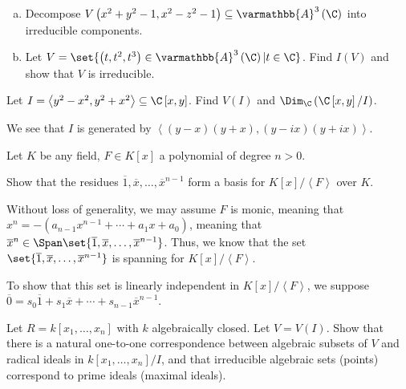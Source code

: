 \documentclass[10pt]{mypackage}
\renewcommand*{\mathbb}[1]{\varmathbb{#1}}
\newcommand{\A}{\mathbb{A}}
\begin{document}
\begin{exercise}[Exercise 1.33]\hfill
  \begin{enumerate}[(a)]
    \item Decompose $V\left( x^2 + y^2 - 1,x^2 - z^2 - 1 \right)\subseteq \A^3\left( \C \right)$ into irreducible components.
    \item Let $V = \set{\left( t,t^2,t^3 \right)\in \A^3\left( \C \right) | t\in \C}$. Find $I(V)$ and show that $V$ is irreducible.
  \end{enumerate}
\end{exercise}
\begin{exercise}[Exercise 1.36]
  Let $I = \left\langle y^2-x^2,y^2 + x^2 \right\rangle\subseteq \C\left[ x,y \right]$. Find $V(I)$ and $\Dim_{\C}\left( \C\left[ x,y \right]/I \right)$.
\end{exercise}
\begin{solution}
  We see that $I$ is generated by $\left\langle \left( y-x \right)\left( y+x \right),\left( y-ix \right)\left( y+ix \right) \right\rangle$. 
\end{solution}
\begin{exercise}[Exercise 1.37]
  Let $K$ be any field, $F\in K\left[ x \right]$ a polynomial of degree $n > 0$.\newline

  Show that the residues $\overline{1},\overline{x},\dots,\overline{x}^{n-1}$ form a basis for $K\left[ x \right]/\left\langle F \right\rangle$ over $K$.
\end{exercise}
\begin{solution}
  Without loss of generality, we may assume $F$ is monic, meaning that $x^{n} = -\left( a_{n-1}x^{n-1} + \cdots + a_1x + a_0 \right)$, meaning that $\overline{x}^n \in \Span\set{\overline{1},\overline{x},\dots,\overline{x}^{n-1}}$. Thus, we know that the set $\set{\overline{1},\overline{x},\dots,\overline{x}^{n-1}}$ is spanning for $K\left[ x \right]/\left\langle F \right\rangle$.\newline

  To show that this set is linearly independent in $K\left[ x \right]/\left\langle F \right\rangle$, we suppose $\overline{0} = s_0\overline{1} + s_1\overline{x} + \cdots + s_{n-1}\overline{x}^{n-1}$.
\end{solution}
\begin{exercise}[Exercise 1.38]
  Let $R = k\left[ x_1,\dots,x_n \right]$ with $k$ algebraically closed. Let $V = V(I)$. Show that there is a natural one-to-one correspondence between algebraic subsets of $V$ and radical ideals in $k\left[ x_1,\dots,x_n \right]/I$, and that irreducible algebraic sets (points) correspond to prime ideals (maximal ideals).
\end{exercise}
\end{document}
